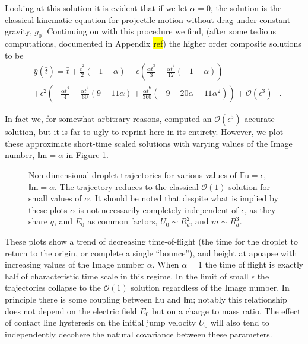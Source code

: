 \documentclass[a4paper, 12pt]{article}
\begin{document}
Looking at this solution it is evident that if we let $\alpha=0$, the solution is the classical kinematic equation for projectile motion without drag under constant gravity, $g_0$. Continuing on with this procedure we find, (after some tedious computations, documented in Appendix \hl{ref}) the higher order composite solutions to be
\begin{eqnarray*}
&\bar{y}(\bar{t}) = \bar{t} + \frac{\bar{t}^{2}}{2} \left(-1 - \alpha\right) + \epsilon \left(\frac{\alpha \bar{t}^{3}}{3} + \frac{\alpha \bar{t}^{4}}{12} \left(-1 - \alpha\right)\right)& \\
&+ \epsilon^{2} \left(- \frac{\alpha \bar{t}^{4}}{4} + \frac{\alpha \bar{t}^{5}}{60} \left(9 + 11 \alpha\right) + \frac{\alpha \bar{t}^{6}}{360} \left(-9 - 20 \alpha - 11 \alpha^{2}\right)\right) + \mathcal{O}(\epsilon^3)&.
\end{eqnarray*}

In fact we, for somewhat arbitrary reasons, computed an $\mathcal{O}(\epsilon^5)$ accurate solution, but it is far to ugly to reprint here in its entirety. However, we plot these approximate short-time scaled solutions with varying values of the Image number, $\mathbb{I}\mbox{m} = \alpha$ in Figure \ref{fig:short_times}.
\begin{figure}[htb]
    \centering
    \resizebox{1\textwidth}{!}{}
    \caption{Non-dimensional droplet trajectories for various values of $\mathbb{E}\mbox{u}=\epsilon$, $\mathbb{I}\mbox{m}=\alpha$. The trajectory reduces to the classical $\mathcal{O}(1)$ solution for small values of $\alpha$. It should be noted that despite what is implied by these plots $\alpha$ is not necessarily completely independent of $\epsilon$, as they share $q$, and $E_0$ as common factors, $U_0 \sim R_d^2$, and $m \sim R_d^3$.}
    \label{fig:short_times}
\end{figure}
These plots show a trend of decreasing time-of-flight (the time for the droplet to return to the origin, or complete a single ``bounce''), and height at apoapse with increasing values of the Image number $\alpha$. When $\alpha = 1$ the time of flight is exactly half of characteristic time scale in this regime. In the limit of small $\epsilon$ the trajectories collapse to the $\mathcal{O}(1)$ solution regardless of the Image number. In principle there is some coupling between $\mathbb{E}\mbox{u}$ and $\mathbb{I}\mbox{m}$; notably this relationship does not depend on the electric field $E_0$ but on a charge to mass ratio. The effect of contact line hysteresis on the initial jump velocity $U_0$ will also tend to independently decohere the natural covariance between these parameters.
\end{document}
